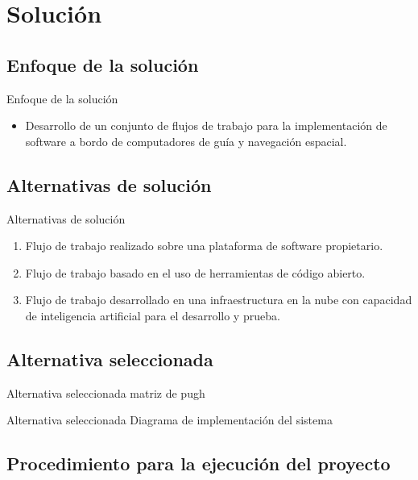 \documentclass[10pt,aspectratio=169]{beamer} %
\begin{document}
\section{Solución}

\subsection{Enfoque de la solución}


\begin{frame}{Enfoque de la solución }
  \begin{itemize}
    \item Desarrollo de un conjunto de flujos de trabajo para la implementación de software 
    a bordo de computadores de guía y navegación espacial.
  \end{itemize}
\end{frame}


\subsection{Alternativas de solución}

\begin{frame}{Alternativas de solución}
  \begin{enumerate}
    \item Flujo de trabajo realizado sobre una plataforma de software propietario. 
    \item Flujo de trabajo basado en el uso de herramientas de código abierto. 
    \item Flujo de trabajo desarrollado en una infraestructura en la nube 
          con capacidad de inteligencia artificial para el desarrollo y prueba.
  \end{enumerate}
\end{frame}

\subsection{Alternativa seleccionada}

\begin{frame}{Alternativa seleccionada}
  matriz de pugh
\end{frame}

\begin{frame}{Alternativa seleccionada}
  Diagrama de implementación del sistema
\end{frame}

\subsection{Procedimiento para la ejecución del proyecto}
\end{document}
